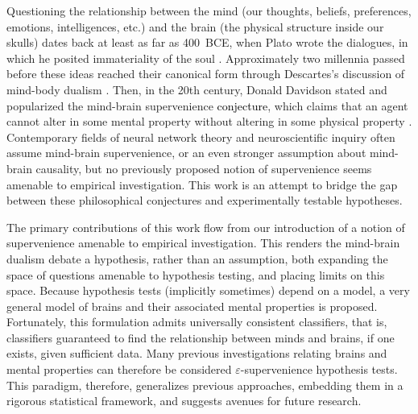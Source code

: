 \documentclass{article}
\newcommand{\eps}{\varepsilon}
\providecommand{\tr}[1]{\textcolor{black}{#1}}
\begin{document}

\newpage

\noindent Questioning the relationship between the mind (our thoughts, beliefs, preferences, emotions, intelligences, etc.) and the brain (the physical structure inside our skulls) dates back at least as far as 400~BCE, when Plato wrote the dialogues, in which he posited immateriality of the soul \cite{Plato97}. Approximately two millennia passed before these ideas reached their canonical form through Descartes's discussion of mind-body dualism \cite{Descartes1641}. Then, in the 20th century, Donald Davidson stated and popularized the mind-brain supervenience \tr{conjecture}, which claims that an agent cannot alter in some mental property without altering in some physical property \cite{Davidson70}. Contemporary fields of neural network theory and neuroscientific inquiry often assume mind-brain supervenience, or an even stronger assumption about mind-brain causality, but no previously proposed notion of supervenience seems amenable to empirical investigation. This work is an attempt to bridge the gap between these philosophical conjectures and experimentally testable hypotheses. %

The primary contributions of this work flow from our introduction of a notion of supervenience amenable to empirical investigation.  This renders the mind-brain dualism debate a hypothesis, rather than an assumption, both expanding the space of questions amenable to hypothesis testing, and placing limits on this space.  Because hypothesis tests (implicitly sometimes) depend on a model, a very general model of brains and their associated mental properties is proposed.  Fortunately, this formulation admits universally consistent classifiers, that is, classifiers guaranteed to find the relationship between minds and brains, if one exists, given sufficient data.  Many previous investigations relating brains and mental properties can therefore be considered $\eps$-supervenience hypothesis tests.  This paradigm, therefore, generalizes previous approaches, embedding them in a rigorous statistical framework, and suggests avenues for future research.
\end{document}
